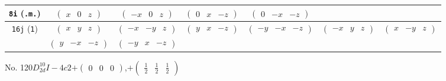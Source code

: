 \documentclass[fleqn,9pt,landscape]{jsarticle}
\begin{document}
\begin{center}
\begin{longtable}{ccccccc}
{\tt 8i} ({\tt .m.}) & $ \begin{pmatrix} x & 0 & z \end{pmatrix} $ & $ \begin{pmatrix} - x & 0 & z \end{pmatrix} $ & $ \begin{pmatrix} 0 & x & - z \end{pmatrix} $ & $ \begin{pmatrix} 0 & - x & - z \end{pmatrix} $ & $  $ & $  $ \\ \hline
{\tt 16j} ({\tt 1}) & $ \begin{pmatrix} x & y & z \end{pmatrix} $ & $ \begin{pmatrix} - x & - y & z \end{pmatrix} $ & $ \begin{pmatrix} y & x & - z \end{pmatrix} $ & $ \begin{pmatrix} - y & - x & - z \end{pmatrix} $ & $ \begin{pmatrix} - x & y & z \end{pmatrix} $ & $ \begin{pmatrix} x & - y & z \end{pmatrix} $ \\
& $ \begin{pmatrix} y & - x & - z \end{pmatrix} $ & $ \begin{pmatrix} - y & x & - z \end{pmatrix} $ & $  $ & $  $ & $  $ & $  $ \\
\end{longtable}
\end{center}
\newpage
No. 120\quad$D_{2d}^{10}$\quad$I-4c2$\quad[ tetragonal ]\quad$+\begin{pmatrix} 0 & 0 & 0 \end{pmatrix}$,\quad $+\begin{pmatrix} \frac{1}{2} & \frac{1}{2} & \frac{1}{2} \end{pmatrix}$
\end{document}

